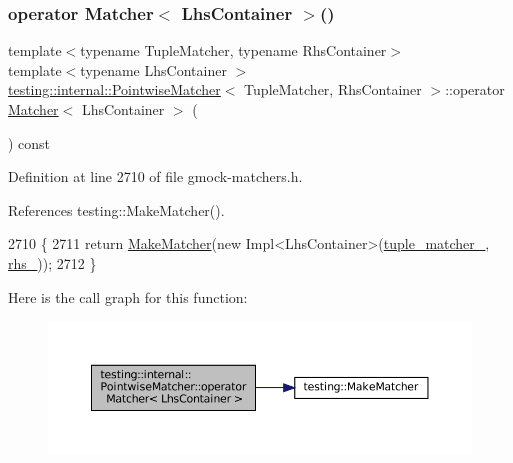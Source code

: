 \subsubsection{\texorpdfstring{operator Matcher$<$ Lhs\+Container $>$()}{operator Matcher< LhsContainer >()}}
{\footnotesize\ttfamily template$<$typename Tuple\+Matcher, typename Rhs\+Container$>$ \\
template$<$typename Lhs\+Container $>$ \\
\hyperlink{classtesting_1_1internal_1_1PointwiseMatcher}{testing\+::internal\+::\+Pointwise\+Matcher}$<$ Tuple\+Matcher, Rhs\+Container $>$\+::operator \hyperlink{classtesting_1_1Matcher}{Matcher}$<$ Lhs\+Container $>$ (\begin{DoxyParamCaption}{ }\end{DoxyParamCaption}) const\hspace{0.3cm}{\ttfamily [inline]}}



Definition at line 2710 of file gmock-\/matchers.\+h.



References testing\+::\+Make\+Matcher().


\begin{DoxyCode}
2710                                          \{
2711     \textcolor{keywordflow}{return} \hyperlink{namespacetesting_a37fd8029ac00e60952440a3d9cca8166}{MakeMatcher}(\textcolor{keyword}{new} Impl<LhsContainer>(\hyperlink{classtesting_1_1internal_1_1PointwiseMatcher_a88ff006de49679fa44b438bfa1f6d153}{tuple\_matcher\_}, 
      \hyperlink{classtesting_1_1internal_1_1PointwiseMatcher_a99dc64b7cd3d5f78742d8a3ed2c4793c}{rhs\_}));
2712   \}
\end{DoxyCode}
Here is the call graph for this function\+:
\nopagebreak
\begin{figure}[H]
\begin{center}
\leavevmode
\includegraphics[width=350pt]{classtesting_1_1internal_1_1PointwiseMatcher_a50b68745b7fea83ab076b22fa0497e7d_cgraph}
\end{center}
\end{figure}


